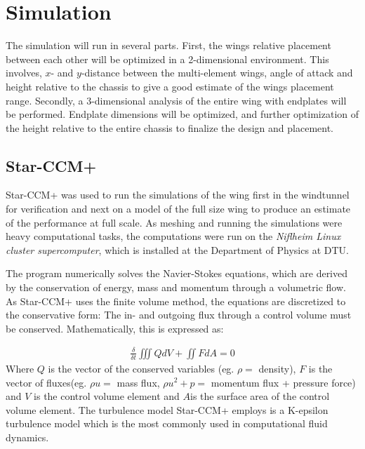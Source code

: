 \chapter{Simulation}
\label{chap:simulations}

  The simulation will run in several parts. First, the wings relative placement between each other will be optimized in a 2-dimensional environment. This involves, $x$- and $y$-distance between the multi-element wings, angle of attack and height relative to the chassis to give a good estimate of the wings placement range. Secondly, a 3-dimensional analysis of the entire wing with endplates will be performed. Endplate dimensions will be optimized, and further optimization of the height relative to the entire chassis to finalize the design and placement.

\section{Star-CCM+}
  Star-CCM+ was used to run the simulations of the wing first in the windtunnel for verification and next on a model of the full size wing to produce an estimate of the performance at full scale. As meshing and running the simulations were heavy computational tasks, the computations were run on the \emph{Niflheim Linux cluster supercomputer}, which is installed at the Department of Physics at DTU.

  The program numerically solves the Navier-Stokes equations, which are derived by the conservation of energy, mass and momentum through a volumetric flow. As Star-CCM+ uses the finite volume method, the equations are discretized to the conservative form: The in- and outgoing flux through a control volume must be conserved. Mathematically, this is expressed as:

  \begin{align}
    \frac{\delta}{\delta t} \iiint Q dV + \iint F dA = 0
  \end{align}
  Where $Q$ is the vector of the conserved variables (eg. $\rho =$ density), $F$ is the vector of fluxes(eg. $\rho u =$ mass flux, $\rho u^2 + p=$ momentum flux + pressure force) and $V$ is the control volume element and $A$is the surface area of the control volume element. The turbulence model Star-CCM+ employs is a K-epsilon turbulence model which is the most commonly used in computational fluid dynamics. %

